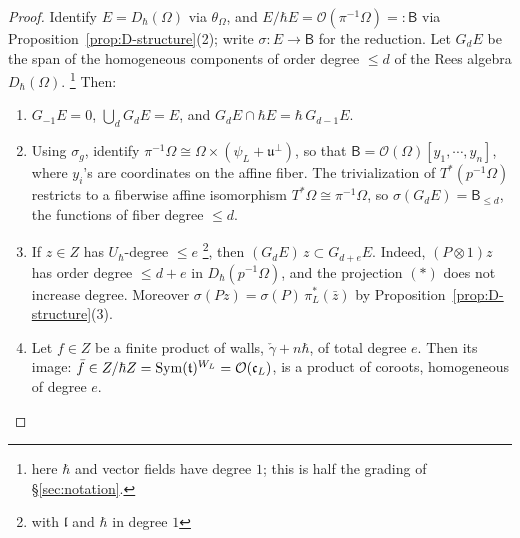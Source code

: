 \documentclass{article}
\theoremstyle{plain}
\theoremstyle{definition}
\theoremstyle{remark}
\numberwithin{equation}{section}
\begin{document}
\begin{proof}
Identify $E=D_\hbar(\Omega)$ via $\theta_\Omega$, and $E/\hbar E=\mathcal O(\pi^{-1}\Omega)=:\mathsf B$ via
Proposition~\ref{prop:D-structure}(2); write $\sigma\colon E\to \mathsf B$ for the reduction. Let $G_dE$ be the span of the
homogeneous components of order degree $\le d$ of the Rees algebra $D_\hbar(\Omega)$. \footnote{here $\hbar$ and vector fields have
degree $1$; this is half the grading of \S\ref{sec:notation}.} Then:
\begin{enumerate}
\item[(a)] $G_{-1}E=0$, $\bigcup_dG_dE=E$, and $G_dE\cap\hbar E=\hbar\,G_{d-1}E$.
\item[(b)] Using $\sigma_g$, identify $\pi^{-1}\Omega\cong \Omega\times(\psi_L+\mathfrak u^\perp)$, so that
$\mathsf B=\mathcal O(\Omega)[y_1,\cdots,y_n]$, where $y_i$'s are coordinates on the affine fiber. The trivialization of $T^*(p^{-1}\Omega)$ restricts to a fiberwise affine
isomorphism $T^*\Omega\cong\pi^{-1}\Omega$, so $\sigma(G_dE)=\mathsf B_{\le d}$, the functions of fiber degree $\le d$.
\item[(c)] If $z\in Z$ has $U_\hbar$-degree $\le e$ \footnote{with $\mathfrak l$ and $\hbar$ in degree $1$}, then
$(G_dE)\,z\subset G_{d+e}E$. Indeed, $(P\otimes1)z$ has order degree $\le d+e$ in $D_\hbar(p^{-1}\Omega)$, and the
projection $(\ast)$ does not increase degree. Moreover $\sigma(Pz)=\sigma(P)\,\pi_L^*(\bar z)$ by
Proposition~\ref{prop:D-structure}(3).
\item[(d)] Let $f\in Z$ be a finite product of walls, $\check\gamma+n\hbar$, of total degree $e$. Then its image:
$\bar f\in Z/\hbar Z=\operatorname{Sym}(\mathfrak t)^{W_L}=\mathcal O(\mathfrak c_L)$, is a product of coroots, homogeneous of degree $e$.


\end{enumerate}
\end{proof}
\end{document}
